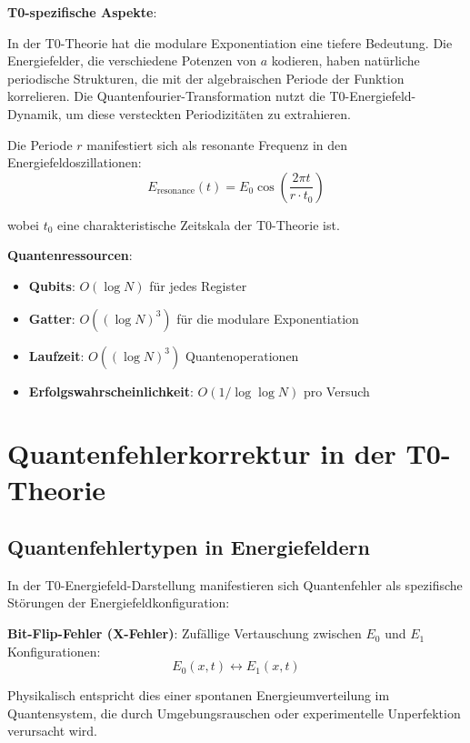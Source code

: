 \documentclass[12pt,a4paper]{article}
\theoremstyle{definition}
\theoremstyle{remark}
\begin{document}
\textbf{T0-spezifische Aspekte}:

In der T0-Theorie hat die modulare Exponentiation eine tiefere Bedeutung. Die Energiefelder, die verschiedene Potenzen von $a$ kodieren, haben nat{\"u}rliche periodische Strukturen, die mit der algebraischen Periode der Funktion korrelieren. Die Quantenfourier-Transformation nutzt die T0-Energiefeld-Dynamik, um diese versteckten Periodizit{\"a}ten zu extrahieren.

Die Periode $r$ manifestiert sich als resonante Frequenz in den Energiefeldoszillationen:
\begin{equation}
	E_{\text{resonance}}(t) = E_0 \cos\left(\frac{2\pi t}{r \cdot t_0}\right)
\end{equation}

wobei $t_0$ eine charakteristische Zeitskala der T0-Theorie ist.

\textbf{Quantenressourcen}:
\begin{itemize}
	\item \textbf{Qubits}: $O(\log N)$ f{\"u}r jedes Register
	\item \textbf{Gatter}: $O((\log N)^3)$ f{\"u}r die modulare Exponentiation
	\item \textbf{Laufzeit}: $O((\log N)^3)$ Quantenoperationen
	\item \textbf{Erfolgswahrscheinlichkeit}: $O(1/\log \log N)$ pro Versuch
\end{itemize}

\section{Quantenfehlerkorrektur in der T0-Theorie}

\subsection{Quantenfehlertypen in Energiefeldern}

In der T0-Energiefeld-Darstellung manifestieren sich Quantenfehler als spezifische St{\"o}rungen der Energiefeldkonfiguration:

\textbf{Bit-Flip-Fehler (X-Fehler)}:
Zuf{\"a}llige Vertauschung zwischen $E_0$ und $E_1$ Konfigurationen:
\begin{equation}
	E_0(x,t) \leftrightarrow E_1(x,t)
\end{equation}

Physikalisch entspricht dies einer spontanen Energieumverteilung im Quantensystem, die durch Umgebungsrauschen oder experimentelle Unperfektion verursacht wird.
\end{document}

